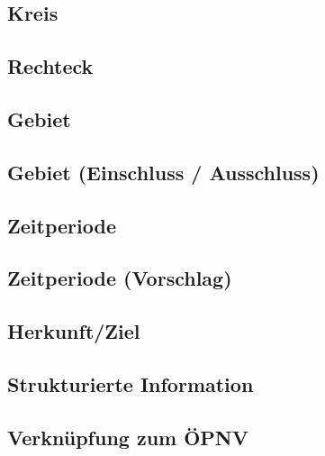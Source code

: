 \subsection*{Kreis}



\subsection*{Rechteck}



\subsection*{Gebiet}



\subsection*{Gebiet (Einschluss / Ausschluss)}



\subsection*{Zeitperiode}



\subsection*{Zeitperiode (Vorschlag)}



\subsection*{Herkunft/Ziel}



\subsection*{Strukturierte Information}



\subsection*{Verknüpfung zum ÖPNV}




